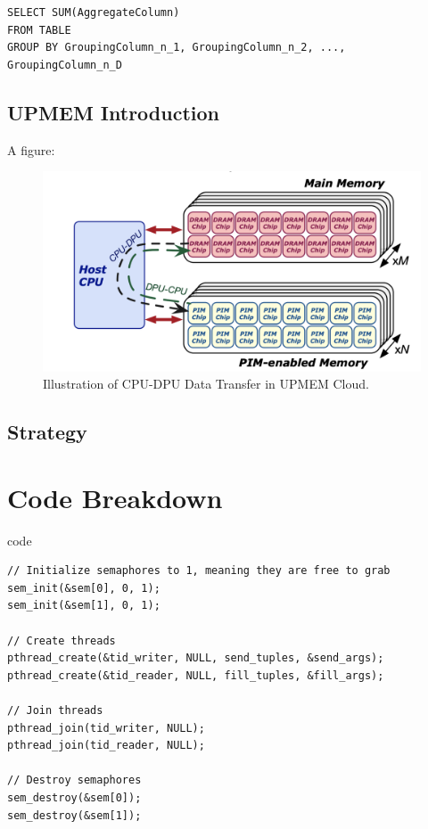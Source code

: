 \documentclass[11pt,A4]{article}
\begin{document}
\lstset{language=SQL}
\lstset{breaklines=true}
\begin{lstlisting}
SELECT SUM(AggregateColumn)
FROM TABLE
GROUP BY GroupingColumn_n_1, GroupingColumn_n_2, ..., GroupingColumn_n_D
\end{lstlisting}

\subsection{UPMEM Introduction}

A figure:

\begin{figure}[H]
\centering
\includegraphics[scale=0.60]{UPMEM.png}
\caption{Illustration of CPU-DPU Data Transfer in UPMEM Cloud.}
\end{figure}


\subsection{Strategy}





\section{Code Breakdown}
code

\lstset{language=C}
\lstset{breaklines=true}
\begin{lstlisting}
// Initialize semaphores to 1, meaning they are free to grab
sem_init(&sem[0], 0, 1);
sem_init(&sem[1], 0, 1);

// Create threads
pthread_create(&tid_writer, NULL, send_tuples, &send_args);
pthread_create(&tid_reader, NULL, fill_tuples, &fill_args);

// Join threads
pthread_join(tid_writer, NULL);
pthread_join(tid_reader, NULL);

// Destroy semaphores
sem_destroy(&sem[0]);
sem_destroy(&sem[1]);
\end{lstlisting}
\end{document}
